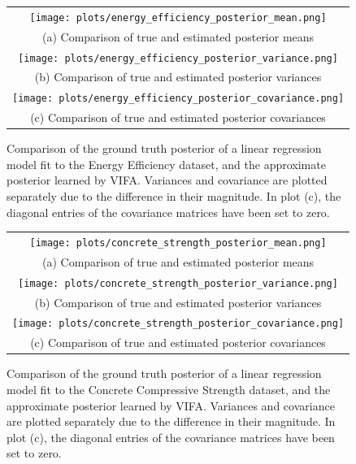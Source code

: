 \documentclass[10pt]{article} %
\begin{document}
\begin{figure}[!htbp] 
	\begin{tabular}{c}
		\texttt{[image: plots/energy\_efficiency\_posterior\_mean.png]} \\
		(a) Comparison of true and estimated posterior means \\[6pt] 
		 \texttt{[image: plots/energy\_efficiency\_posterior\_variance.png]} \\
		(b) Comparison of true and estimated posterior variances \\[6pt] 
		\texttt{[image: plots/energy\_efficiency\_posterior\_covariance.png]} \\
		(c) Comparison of true and estimated posterior covariances \\[6pt] 
	\end{tabular}
	\caption{Comparison of the ground truth posterior of a linear regression model fit to the Energy Efficiency dataset, and the approximate posterior learned by VIFA. Variances and covariance are plotted separately due to the difference in their magnitude. In plot (c), the diagonal entries of the covariance matrices have been set to zero.}
	\label{fig:posterior_energy_efficiency}
\end{figure}

\begin{figure}[!htbp] 
	\begin{tabular}{c}
		\texttt{[image: plots/concrete\_strength\_posterior\_mean.png]} \\
		(a) Comparison of true and estimated posterior means \\[6pt] 
		 \texttt{[image: plots/concrete\_strength\_posterior\_variance.png]} \\
		(b) Comparison of true and estimated posterior variances \\[6pt] 
		\texttt{[image: plots/concrete\_strength\_posterior\_covariance.png]} \\
		(c) Comparison of true and estimated posterior covariances \\[6pt] 
	\end{tabular}
	\caption{Comparison of the ground truth posterior of a linear regression model fit to the Concrete Compressive Strength dataset, and the approximate posterior learned by VIFA. Variances and covariance are plotted separately due to the difference in their magnitude. In plot (c), the diagonal entries of the covariance matrices have been set to zero.}
	\label{fig:posterior_concrete_strength}
\end{figure} 
\end{document}
